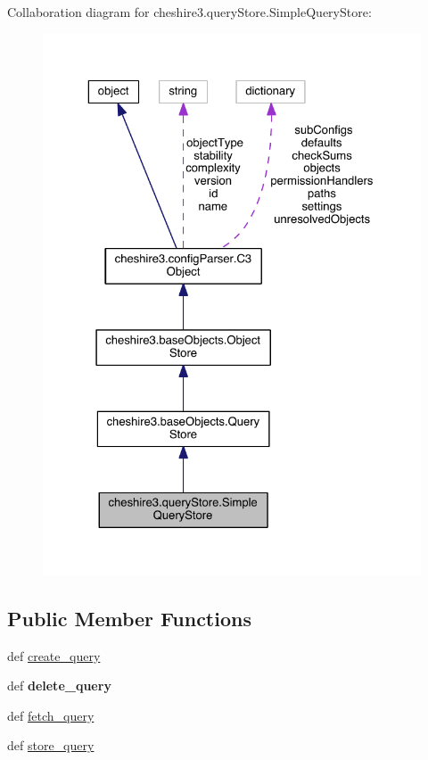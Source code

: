Collaboration diagram for cheshire3.\-query\-Store.\-Simple\-Query\-Store\-:
\nopagebreak
\begin{figure}[H]
\begin{center}
\leavevmode
\includegraphics[width=325pt]{classcheshire3_1_1query_store_1_1_simple_query_store__coll__graph}
\end{center}
\end{figure}
\subsection*{Public Member Functions}
\begin{DoxyCompactItemize}
\item 
def \hyperlink{classcheshire3_1_1query_store_1_1_simple_query_store_acd293eeeac0cdb865b474c796d8805eb}{create\-\_\-query}
\item 
\hypertarget{classcheshire3_1_1query_store_1_1_simple_query_store_ab72c069e784fea2f123790065b21eb7a}{def {\bfseries delete\-\_\-query}}\label{classcheshire3_1_1query_store_1_1_simple_query_store_ab72c069e784fea2f123790065b21eb7a}

\item 
def \hyperlink{classcheshire3_1_1query_store_1_1_simple_query_store_a2f5710fdb287c8fd354a99d38481dd85}{fetch\-\_\-query}
\item 
def \hyperlink{classcheshire3_1_1query_store_1_1_simple_query_store_a2771be6d33ff4aafb3ac06b69c369475}{store\-\_\-query}
\end{DoxyCompactItemize}
